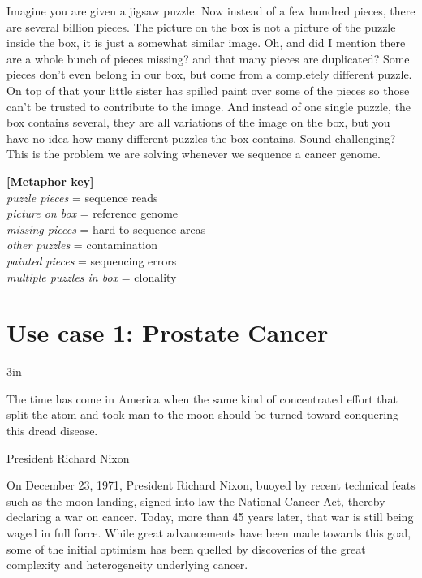 \begin{center}
\begin{minipage}{6in}
\begin{center}
{\vspace*{0.5cm}

Imagine you are given a jigsaw puzzle. Now instead of a few hundred pieces, there are several billion pieces. The picture on the box is not a picture of the puzzle inside the box,
it is just a somewhat similar image. Oh, and did I mention there are a whole bunch of pieces missing? and that many pieces are duplicated? Some pieces don't even belong in our box,
but come from a completely different puzzle. On top of that your little sister has spilled paint over some of the pieces so those can't be trusted to contribute to the image. And instead of one
single puzzle, the box contains several, they are all variations of the image on the box, but you have no idea how many different puzzles the box contains. Sound challenging? This is the problem we are solving whenever we sequence a cancer genome.

\vspace*{0.5cm}
\textbf{[Metaphor key]} \\
\textit{puzzle pieces} = sequence reads \\
\textit{picture on box} = reference genome \\
\textit{missing pieces} = hard-to-sequence areas \\
\textit{other puzzles} = contamination \\
\textit{painted pieces} = sequencing errors \\
\textit{multiple puzzles in box} = clonality
}

\end{center}
\end{minipage}
\end{center}



\newpage
\section{Use case 1: Prostate Cancer}

\epigraph{3in}{The time has come in America when the same kind of concentrated effort that split the atom and took man to the moon should be turned toward conquering this dread disease.}{President Richard Nixon}

On December 23, 1971, President Richard Nixon, buoyed by recent technical feats such as the moon landing, signed into law the National Cancer Act, thereby declaring a war on cancer. Today, more than 45 years later, that war is still being waged in full force. While great advancements have been made towards this goal, some of the initial optimism has been quelled by discoveries of the great complexity and heterogeneity underlying cancer.


